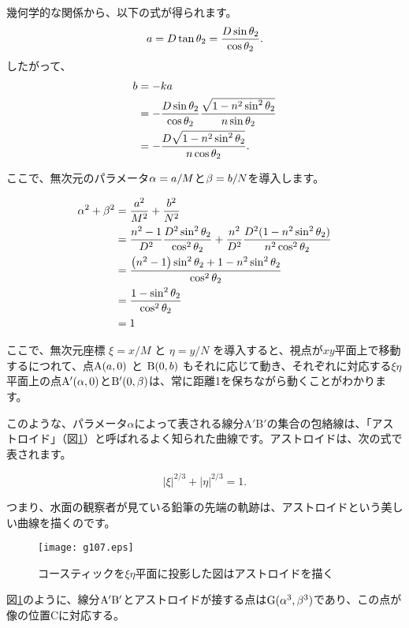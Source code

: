 \documentclass[twocolumn]{article}
\begin{document}
	幾何学的な関係から、以下の式が得られます。
	$${a} = D\tan\theta_2 = \dfrac{D\sin\theta_2}{\cos\theta_2}.$$
	したがって、
	$$\begin{aligned}
		{b} &= -k{a} \\
		&= -\dfrac{D\sin\theta_2}{\cos\theta_2}
		\dfrac{\sqrt{1-n^2\sin^2\theta_2}}{n\sin\theta_2}\\
		&=-\dfrac{D\sqrt{1-n^2\sin^2\theta_2}}{n\cos\theta_2}.
	\end{aligned}$$
	
	ここで、無次元のパラメータ${\alpha}={a}/M$と${\beta}={b}/N$を導入します。
	
	$$ \begin{aligned}
		\greeka^2 + \greekb^2 &= \dfrac{\romana^2}{M^2}+\dfrac{\romanb^2}{N^2}\\
		&=\dfrac{n^2-1}{D^2}\dfrac{D^2\sin^2\theta_2}{\cos^2\theta_2}%
		+\dfrac{n^2}{D^2}\dfrac{D^2(1-n^2\sin^2\theta_2)}{n^2\cos^2\theta_2}\\
		&=\dfrac{\left(n^2-1\right)\sin^2\theta_2 + 1-n^2\sin^2\theta_2}
		{\cos^2\theta_2}\\
		&=\dfrac{1-\sin^2\theta_2}{\cos^2\theta_2}\\
		&= 1
	\end{aligned}$$
	
	ここで、無次元座標 $\xi=x/M$ と $\eta=y/N$ を導入すると、視点が$xy$平面上で移動するにつれて、点$\mathrm{A}({a}, 0)$ と $\mathrm{B}(0, {b})$ もそれに応じて動き、それぞれに対応する$\xi\eta$平面上の点$\mathrm{A'}({\alpha}, 0)$と$\mathrm{B'}(0, {\beta})$は、常に距離1を保ちながら動くことがわかります。
	
	このような、パラメータ$\alpha$によって表される線分${\mathrm{A'B'}}$の集合の包絡線は、「アストロイド」（図\ref{fig:astroid}）と呼ばれるよく知られた曲線です。アストロイドは、次の式で表されます。
	
	$$ \left| \xi \right|^{2/3} + \left| \eta \right|^{2/3} = 1. $$
	
	つまり、水面の観察者が見ている鉛筆の先端の軌跡は、アストロイドという美しい曲線を描くのです。
	
	\begin{figure}[h]
		\centering
		\texttt{[image: g107.eps]}	
		\caption{コースティックを$\xi\eta$平面に投影した図はアストロイドを描く}
		\label{fig:astroid}
	\end{figure}
	
	図\ref{fig:astroid}のように、線分${\mathrm{{A^{\prime}}{B^{\prime}}}}$とアストロイドが接する点は$\mathrm{G}({\alpha}^3, {\beta}^3)$であり、この点が像の位置$\mathrm{C}$に対応する。
	
\end{document}
